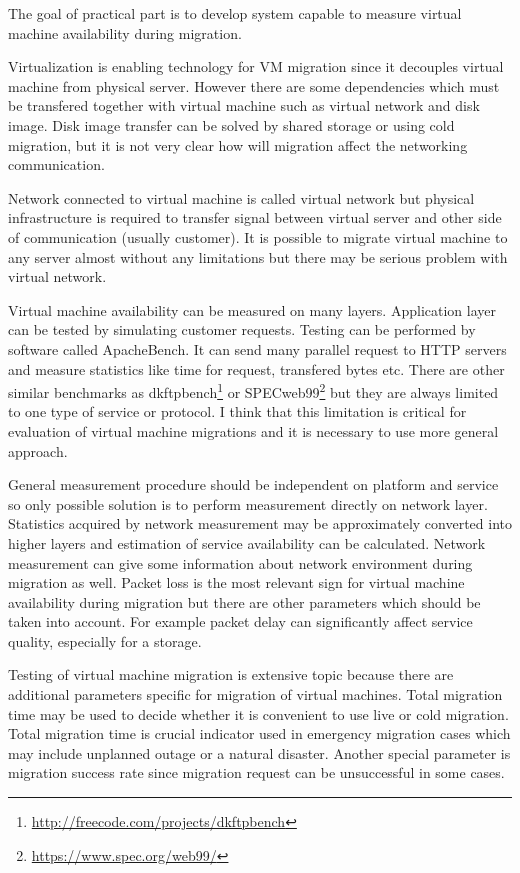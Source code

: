 
The goal of practical part is to develop system capable to measure virtual machine availability during migration. 

Virtualization is enabling technology for \Ac{VM} migration since it decouples virtual machine from physical server. However there are some dependencies which must be transfered together with virtual machine such as virtual network and disk image. Disk image transfer can be solved by shared storage or using cold migration, but it is not very clear how will migration affect the networking communication.

Network connected to virtual machine is called virtual network but physical infrastructure is required to transfer signal between virtual server and other side of communication (usually customer). It is possible to migrate virtual machine to any server almost without any limitations but there may be serious problem with virtual network. 

Virtual machine availability can be measured on many layers. Application layer can be tested by simulating customer requests. Testing can be performed by software called ApacheBench. It can send many parallel request to \Ac{HTTP} servers and measure statistics like time for request, transfered bytes etc. 
There are other similar benchmarks as dkftpbench\footnote{\url{http://freecode.com/projects/dkftpbench}} or SPECweb99\footnote{\url{https://www.spec.org/web99/}} but they are always limited to one type of service or protocol. I think that this limitation is critical for evaluation of virtual machine migrations and it is necessary to use more general approach.

General measurement procedure should be independent on platform and service so only possible solution is to perform measurement directly on network layer. Statistics acquired by network measurement may be approximately converted into higher layers and estimation of service availability can be calculated. Network measurement can give some information about network environment during migration as well. Packet loss is the most relevant sign for virtual machine availability during migration but there are other parameters which should be taken into account. For example packet delay can significantly affect service quality, especially for a storage.

Testing of virtual machine migration is extensive topic because there are additional parameters specific for migration of virtual machines. Total migration time may be used to decide whether it is convenient to use live or cold migration. Total migration time is crucial indicator used in emergency migration cases which may include unplanned outage or a natural disaster. Another special parameter is migration success rate since migration request can be unsuccessful in some cases.

